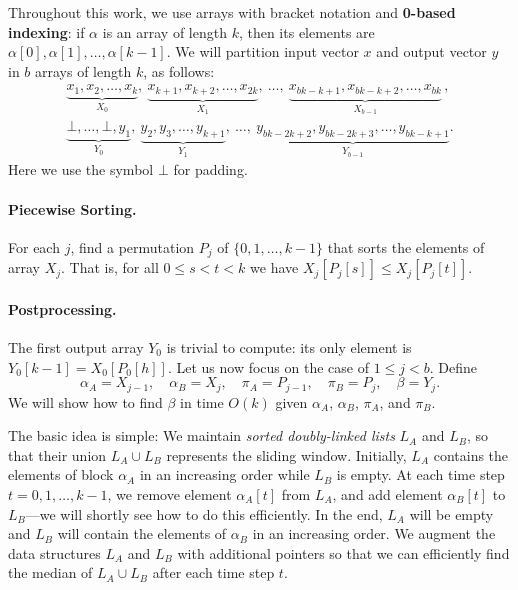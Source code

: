 \documentclass[a4paper,11pt]{article}
\begin{document}
Throughout this work, we use arrays with bracket notation and \textbf{0-based indexing}: if $\alpha$ is an array of length $k$, then its elements are $\alpha[0], \alpha[1], \dotsc, \alpha[k-1]$. We will partition input vector $x$ and output vector $y$ in $b$ arrays of length $k$, as follows:
\newcommand{\myunderbrace}[2]{\underbrace{#1}_{\displaystyle #2}}
\begin{gather*}
    \myunderbrace{x_1, x_2, \dotsc, x_k}{X_0},
    \ \myunderbrace{x_{k+1}, x_{k+2}, \dotsc, x_{2k}}{X_1},
    \ \dotsc,
    \ \myunderbrace{x_{bk-k+1}, x_{bk-k+2}, \dotsc, x_{bk}}{X_{b-1}}\,, 
    \\[5pt]
    \myunderbrace{\bot, \dotsc, \bot, y_1}{Y_0},
    \ \myunderbrace{y_{2}, y_{3}, \dotsc, y_{k+1}}{Y_1},
    \ \dotsc,
    \ \myunderbrace{y_{bk-2k+2}, y_{bk-2k+3}, \dotsc, y_{bk-k+1}}{Y_{b-1}}.
\end{gather*}
Here we use the symbol $\bot$ for padding.

\pagebreak

\paragraph{Piecewise Sorting.}

For each $j$, find a permutation $P_j$ of $\{0,1,\dotsc,k-1\}$ that sorts the elements of array $X_j$. That is, for all $0 \le s < t < k$ we have $X_j[P_j[s]] \le X_j[P_j[t]]$.

\paragraph{Postprocessing.}

The first output array $Y_0$ is trivial to compute: its only element is $Y_0[k-1] = X_0[P_0[h]]$. Let us now focus on the case of $1 \le j < b$. Define
\[
    \alpha_A = X_{j-1}, \quad
    \alpha_B = X_{j}, \quad
    \pi_A = P_{j-1}, \quad
    \pi_B = P_{j}, \quad
    \beta = Y_j.
\]
We will show how to find $\beta$ in time $O(k)$ given $\alpha_A$, $\alpha_B$, $\pi_A$, and $\pi_B$.

The basic idea is simple: We maintain \emph{sorted doubly-linked lists} $L_A$ and $L_B$, so that their union $L_A \cup L_B$ represents the sliding window. Initially, $L_A$ contains the elements of block $\alpha_A$ in an increasing order while $L_B$ is empty. At each time step $t = 0,1,\dotsc,k-1$, we remove element $\alpha_A[t]$ from $L_A$, and add element $\alpha_B[t]$ to $L_B$---we will shortly see how to do this efficiently. In the end, $L_A$ will be empty and $L_B$ will contain the elements of $\alpha_B$ in an increasing order. We augment the data structures $L_A$ and $L_B$ with additional pointers so that we can efficiently find the median of $L_A \cup L_B$ after each time step $t$.
\end{document}

